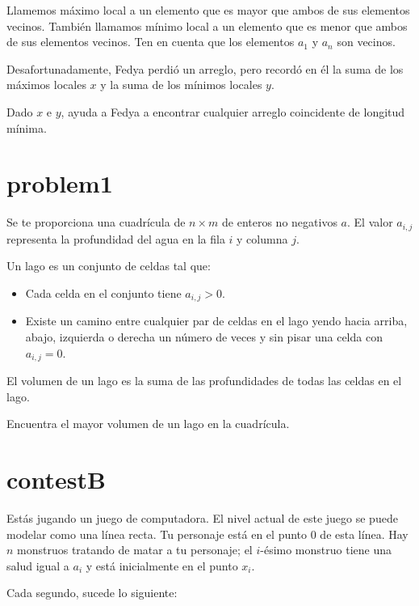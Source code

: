 \documentclass{article}
\begin{document}
Llamemos máximo local a un elemento que es mayor que ambos de sus elementos vecinos. También llamamos mínimo local a un elemento que es menor que ambos de sus elementos vecinos. Ten en cuenta que los elementos $a_1$ y $a_n$ son vecinos.

Desafortunadamente, Fedya perdió un arreglo, pero recordó en él la suma de los máximos locales $x$ y la suma de los mínimos locales $y$.

Dado $x$ e $y$, ayuda a Fedya a encontrar cualquier arreglo coincidente de longitud mínima.

\section{problem1}%
\label{sec:problem1}
Se te proporciona una cuadrícula de $n \times m$ de enteros no negativos $a$. El valor $a_{i,j}$ representa la profundidad del agua en la fila $i$ y columna $j$.

Un lago es un conjunto de celdas tal que:

\begin{itemize}
    \item Cada celda en el conjunto tiene $a_{i,j} > 0$.
    \item Existe un camino entre cualquier par de celdas en el lago yendo hacia arriba, abajo, izquierda o derecha un número de veces y sin pisar una celda con $a_{i,j} = 0$.
\end{itemize}

El volumen de un lago es la suma de las profundidades de todas las celdas en el lago.

Encuentra el mayor volumen de un lago en la cuadrícula.


\section{contestB}%
\label{sec:contestB}
Estás jugando un juego de computadora. El nivel actual de este juego se puede modelar como una línea recta. Tu personaje está en el punto 0 de esta línea. Hay $n$ monstruos tratando de matar a tu personaje; el $i$-ésimo monstruo tiene una salud igual a $a_i$ y está inicialmente en el punto $x_i$.

Cada segundo, sucede lo siguiente:
\end{document}
